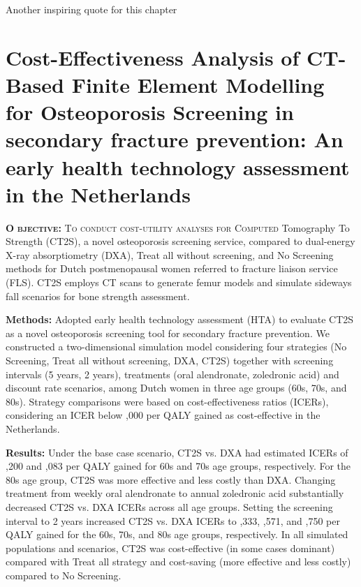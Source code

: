 
\begin{savequote}[75mm]
Another inspiring quote for this chapter
\end{savequote}


\chapter[An early health technology assessment in the Netherlands]{Cost-Effectiveness Analysis of CT-Based Finite Element Modelling for Osteoporosis Screening in secondary fracture prevention: An early health technology assessment in the Netherlands}

\lettrine[lines=3]{\textcolor{SchoolColor}{{\bf O}}}{
{\bf bjective:} To conduct cost-utility analyses for Computed} Tomography To Strength (CT2S), a novel osteoporosis screening service, compared to dual-energy X-ray absorptiometry (DXA), Treat all without screening, and No Screening methods for Dutch postmenopausal women referred to fracture liaison service (FLS). CT2S employs CT scans to generate femur models and simulate sideways fall scenarios for bone strength assessment.

{\bf Methods:} Adopted early health technology assessment (HTA) to evaluate CT2S as a novel osteoporosis screening tool for secondary fracture prevention. We constructed a two-dimensional simulation model considering four strategies (No Screening, Treat all without screening, DXA, CT2S) together with screening intervals (5 years, 2 years), treatments (oral alendronate, zoledronic acid) and discount rate scenarios, among Dutch women in three age groups (60s, 70s, and 80s). Strategy comparisons were based on cost-effectiveness ratios (ICERs), considering an ICER below ,000 per QALY gained as cost-effective in the Netherlands.

{\bf Results:} Under the base case scenario, CT2S vs. DXA had estimated ICERs of ,200 and ,083 per QALY gained for 60s and 70s age groups, respectively. For the 80s age group, CT2S was more effective and less costly than DXA. Changing treatment from weekly oral alendronate to annual zoledronic acid substantially decreased CT2S vs. DXA ICERs across all age groups. Setting the screening interval to 2 years increased CT2S vs. DXA ICERs to ,333, ,571, and ,750 per QALY gained for the 60s, 70s, and 80s age groups, respectively. In all simulated populations and scenarios, CT2S was cost-effective (in some cases dominant) compared with Treat all strategy and cost-saving (more effective and less costly) compared to No Screening.

